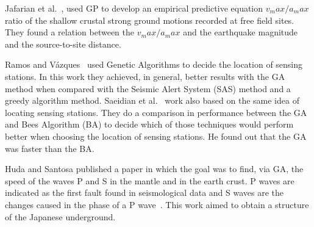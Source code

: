 Jafarian et al.~\cite{jafarian2010empirical}, used GP to develop an
empirical predictive equation $v_max/a_max$ ratio of the shallow
crustal strong ground motions recorded at free field sites. They found
a relation between the $v_max/a_max$ and the earthquake magnitude and
the source-to-site distance.
 
Ramos and Vázques~\cite{Ramos2011} used Genetic Algorithms to decide
the location of sensing stations. In this work they achieved, in
general, better results with the GA method when compared with the
Seismic Alert System (SAS) method and a greedy algorithm
method. Saeidian et al.~\cite{saeidian2016evaluation} work also based
on the same idea of locating sensing stations. They do a comparison in
performance between the GA and Bees Algorithm (BA) to decide which of
those techniques would perform better when choosing the location of
sensing stations. He found out that the GA was faster than the BA.

Huda and Santosa \cite{ijse5762} published a paper in which the goal
was to find, via GA, the speed of the waves P and S in the mantle and
in the earth crust. P waves are indicated as the first fault found in
seismological data and S waves are the changes caused in the phase of
a P wave~\cite{ijse5762}. This work aimed to obtain a structure of the
Japanese underground.
